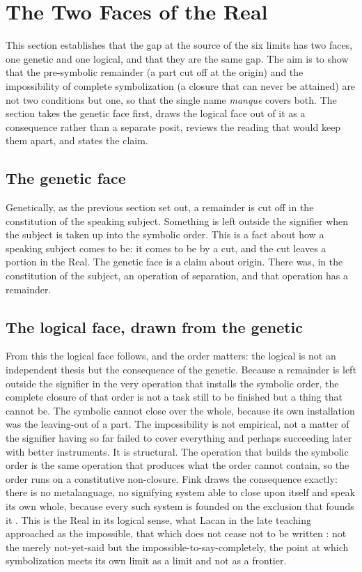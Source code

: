 \section{The Two Faces of the Real}
\label{p26:sec:twofaces}

\noindent
This section establishes that the gap at the source of the six limits has two faces, one genetic and one logical, and that they are the same gap. The aim is to show that the pre-symbolic remainder (a part cut off at the origin) and the impossibility of complete symbolization (a closure that can never be attained) are not two conditions but one, so that the single name \emph{manque} covers both. The section takes the genetic face first, draws the logical face out of it as a consequence rather than a separate posit, reviews the reading that would keep them apart, and states the claim.

\subsection*{The genetic face}

Genetically, as the previous section set out, a remainder is cut off in the constitution of the speaking subject. Something is left outside the signifier when the subject is taken up into the symbolic order. This is a fact about how a speaking subject comes to be: it comes to be by a cut, and the cut leaves a portion in the Real. The genetic face is a claim about origin. There was, in the constitution of the subject, an operation of separation, and that operation has a remainder.

\subsection*{The logical face, drawn from the genetic}

From this the logical face follows, and the order matters: the logical is not an independent thesis but the consequence of the genetic. Because a remainder is left outside the signifier in the very operation that installs the symbolic order, the complete closure of that order is not a task still to be finished but a thing that cannot be. The symbolic cannot close over the whole, because its own installation was the leaving-out of a part. The impossibility is not empirical, not a matter of the signifier having so far failed to cover everything and perhaps succeeding later with better instruments. It is structural. The operation that builds the symbolic order is the same operation that produces what the order cannot contain, so the order runs on a constitutive non-closure. Fink draws the consequence exactly: there is no metalanguage, no signifying system able to close upon itself and speak its own whole, because every such system is founded on the exclusion that founds it \parencite{fink1995subject}. This is the Real in its logical sense, what Lacan in the late teaching approached as the impossible, that which does not cease not to be written \parencite{lacan1998xx}: not the merely not-yet-said but the impossible-to-say-completely, the point at which symbolization meets its own limit as a limit and not as a frontier.

